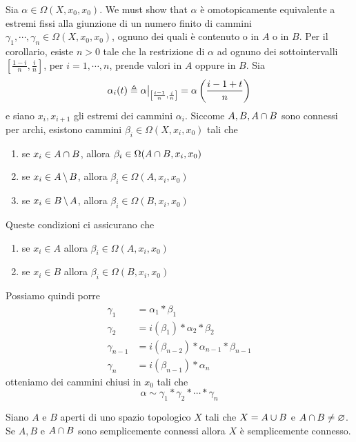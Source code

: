 \documentclass[a4paper]{article}
\begin{document}
\begin{snippetproof}{}
    Sia \(\alpha \in \Omega(X, x_0, x_0)\). We must show that
    \(\alpha\) è omotopicamente equivalente a estremi fissi alla giunzione
    di un numero finito di cammini \(\gamma_1, \cdots, \gamma_n \in \Omega(X, x_0, x_0)\),
    ognuno dei quali è contenuto o in \(A\) o in \(B\).
    Per il corollario, esiste \(n>0\) tale che la restrizione di
    \(\alpha\) ad ognuno dei sottointervalli \([\frac{1-i}{n}, \frac{i}{n}]\),
    per \(i = 1, \cdots, n\), prende valori in \(A\) oppure in \(B\).
    Sia
    \[
        \alpha_i(t) \triangleq \restr{\alpha}{\left[\frac{i-1}{n}, \frac{i}{n}\right]}
        = \alpha\left(\frac{i-1+t}{n}\right)
    \]
    e siano \(x_i, x_{i+1}\) gli estremi dei cammini \(\alpha_i\).
    Siccome \(A, B, A \cap B\) sono connessi per archi, esistono
    cammini \(\beta_i \in \Omega(X, x_i, x_0)\) tali che
    \begin{enumerate}
        \item se \(x_i \in A \cap B\), allora \(\beta_i \in \Omega(A \cap B, x_i, x_0)\)
        \item se \(x_i \in A \,\backslash\, B\), allora \(\beta_i \in \Omega(A, x_i, x_0)\)
        \item se \(x_i \in B \,\backslash\, A\), allora \(\beta_i \in \Omega(B, x_i, x_0)\)
    \end{enumerate}
    Queste condizioni ci assicurano che
    \begin{enumerate}
        \item se \(x_i \in A\) allora \(\beta_i \in \Omega(A, x_i, x_0)\)
        \item se \(x_i \in B\) allora \(\beta_i \in \Omega(B, x_i, x_0)\)
    \end{enumerate}
    Possiamo quindi porre
    \begin{align*}
        \gamma_1 &= \alpha_1 \ast \beta_1 \\
        \gamma_2 &= i(\beta_1) \ast \alpha_2 \ast \beta_2 \\
        \gamma_{n-1} &= i(\beta_{n-2}) \ast \alpha_{n-1} \ast \beta_{n-1} \\
        \gamma_n &= i(\beta_{n-1}) \ast \alpha_n
    \end{align*}
    otteniamo dei cammini chiusi in \(x_0\) tali che
    \[ \alpha \sim \gamma_1 \ast \gamma_2 \ast \cdots \ast \gamma_n \]
\end{snippetproof}

\begin{snippetcorollary}{}
    Siano \(A\) e \(B\) aperti di uno spazio topologico
    \(X\) tali che \(X = A \cup B\) e \(A \cap B \neq \varnothing\).
    Se \(A, B\) e \(A \cap B\)
    sono semplicemente connessi allora \(X\) è semplicemente
    connesso.
\end{snippetcorollary}
\end{document}
